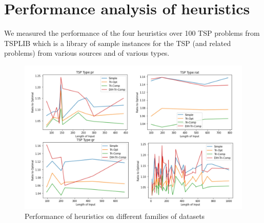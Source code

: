 \section{Performance analysis of heuristics}

We measured the performance of the four heuristics over 100 TSP problems from TSPLIB which is a library of sample instances for the TSP (and related problems) from various sources and of various types.

\begin{figure}[h]
    \centering
    \includegraphics[scale=0.22]{6.jpg}
    \caption{Performance of heuristics on different families of datasets}
\end{figure}